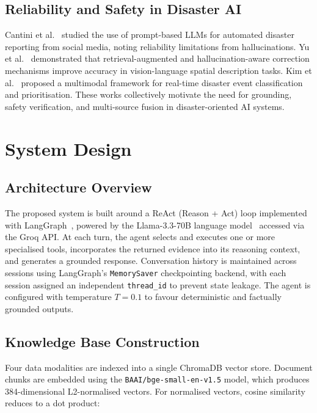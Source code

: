 \documentclass[conference]{IEEEtran}
\begin{document}
\subsection{Reliability and Safety in Disaster AI}
Cantini et al.~\cite{b10} studied the use of prompt-based LLMs for automated
disaster reporting from social media, noting reliability limitations from
hallucinations. Yu et al.~\cite{b14} demonstrated that retrieval-augmented and
hallucination-aware correction mechanisms improve accuracy in vision-language
spatial description tasks. Kim et al.~\cite{b12} proposed a multimodal
framework for real-time disaster event classification and prioritisation.
These works collectively motivate the need for grounding, safety verification,
and multi-source fusion in disaster-oriented AI systems.

\section{System Design}

\subsection{Architecture Overview}

The proposed system is built around a ReAct (Reason + Act) loop implemented
with LangGraph~\cite{b23}, powered by the Llama-3.3-70B language
model~\cite{b24} accessed via the Groq API. At each turn, the agent selects
and executes one or more specialised tools, incorporates the returned evidence
into its reasoning context, and generates a grounded response. Conversation
history is maintained across sessions using LangGraph's \texttt{MemorySaver}
checkpointing backend, with each session assigned an independent
\texttt{thread\_id} to prevent state leakage. The agent is configured with
temperature $T{=}0.1$ to favour deterministic and factually grounded outputs.

\subsection{Knowledge Base Construction}

Four data modalities are indexed into a single ChromaDB vector store.
Document chunks are embedded using the \texttt{BAAI/bge-small-en-v1.5}
model, which produces 384-dimensional L2-normalised vectors. For normalised
vectors, cosine similarity reduces to a dot product:
\end{document}
